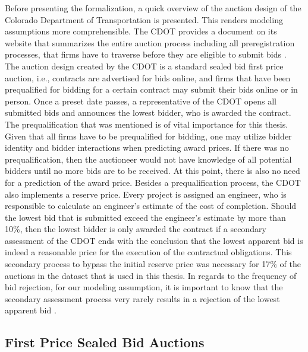 \documentclass[a4paper,12pt, headsepline]{scrartcl}
\numberwithin{equation}{section}
\begin{document}
Before presenting the formalization, a quick overview of the auction design of the Colorado Department of Transportation is presented. This renders modeling assumptions more comprehensible. The CDOT provides a document on its website that summarizes the entire auction process including all preregistration processes, that firms have to traverse before they are eligible to submit bids \citep{CDOTRul}.\\
The auction design created by the CDOT is a standard sealed bid first price auction, i.e., contracts are advertised for bids online, and firms that have been prequalified for bidding for a certain contract may submit their bids online or in person. Once a preset date passes, a representative of the CDOT opens all submitted bids and announces the lowest bidder, who is awarded the contract. The prequalification that was mentioned is of vital importance for this thesis. Given that all firms have to be prequalified for bidding, one may utilize bidder identity and bidder interactions when predicting award prices. If there was no prequalification, then the auctioneer would not have knowledge of all potential bidders until no more bids are to be received. At this point, there is also no need for a prediction of the award price. Besides a prequalification process, the CDOT also implements a reserve price. Every project is assigned an engineer, who is responsible to calculate an engineer's estimate of the cost of completion. Should the lowest bid that is submitted exceed the engineer's estimate by more than 10\%, then the lowest bidder is only awarded the contract if a secondary assessment of the CDOT ends with the conclusion that the lowest apparent bid is indeed a reasonable price for the execution of the contractual obligations. This secondary process to bypass the initial reserve price was necessary for 17\% of the auctions in the dataset that is used in this thesis. In regards to the frequency of bid rejection, for our modeling assumption, it is important to know that the secondary assessment process very rarely results in a rejection of the lowest apparent bid \citep{CDOTRul}. 

\subsection{First Price Sealed Bid Auctions}\label{subsec:fpsba}
\end{document}
